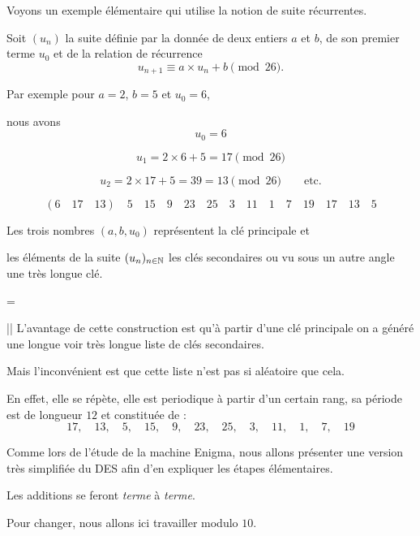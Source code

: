 \change

Voyons un exemple élémentaire qui utilise la notion de suite récurrentes.

Soit $(u_n)$ la suite définie par la donnée de deux entiers $a$ et $b$, de son premier terme $u_0$ et de la relation de récurrence
$$u_{n+1} \equiv a\times u_n + b \pmod{26}.$$

\change

Par exemple pour $a=2$, $b=5$ et $u_0=6$, 

\change

nous avons
$$u_0=6$$

$$u_1=2\times 6+5=17 \pmod{26}$$

$$u_2=2\times 17+5= 39 = 13 \pmod{26} \qquad \mbox{etc.}$$

$$(6 \quad 17\quad 13)\quad 5\quad 15 \quad9\quad 23\quad 25\quad 3 \quad11\quad 1 \quad7\quad 19\quad 17\quad 13\quad 5$$

\change

Les trois nombres $(a,b,u_0)$ représentent la clé principale et 

\change

les éléments de la suite $(u_n)_{n\in\mathbb{N}}$ les clés secondaires ou vu sous un autre angle une très longue clé.

=

|| L'avantage de cette construction est qu'à partir d'une clé principale on a généré une longue voir très longue liste de clés secondaires. 

Mais l'inconvénient est que cette liste n'est pas si aléatoire que cela. 

En effet, elle se répète, elle est periodique à partir d'un certain rang, sa période est de longueur $12$ et constituée de : 
$$17,\quad 13,\quad 5,\quad 15,\quad 9,\quad 23,\quad 25,\quad 3,\quad 11,\quad 1,\quad 7,\quad 19$$


\diapo

Comme lors de l'étude de la machine Enigma, nous allons présenter une 
version très simplifiée du DES afin d'en expliquer les étapes élémentaires.

\change

Les additions se feront \emph{terme} à \emph{terme}.

\change

Pour changer, nous allons ici travailler modulo $10$.

